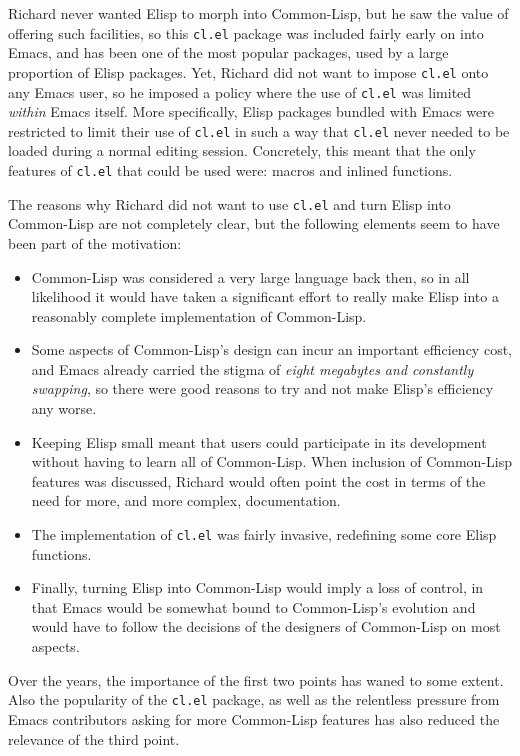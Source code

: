 \documentclass[format=acmsmall, review=false, screen=true]{acmart}
\newcommand \Elisp {Elisp}
\begin{document}
Richard never wanted \Elisp{} to morph into Common-Lisp, but he saw the
value of offering such facilities, so this \texttt{cl.el} package was
included fairly early on into Emacs, and has been one of the most popular
packages, used by a large proportion of \Elisp{} packages.  Yet, Richard did
not want to impose \texttt{cl.el} onto any Emacs user, so he imposed
a policy where the use of \texttt{cl.el} was limited \emph{within} Emacs
itself.  More specifically, \Elisp{} packages bundled with Emacs were
restricted to limit their use of \texttt{cl.el} in such a way that
\texttt{cl.el} never needed to be loaded during a normal editing session.
Concretely, this meant that the only features of \texttt{cl.el} that could
be used were: macros and inlined functions.

The reasons why Richard did not want to use \texttt{cl.el} and turn \Elisp{}
into Common-Lisp are not completely clear, but the following elements seem
to have been part of the motivation:
\begin{itemize}
\item Common-Lisp was considered a very large language back then, so in all
  likelihood it would have taken a significant effort to really make
  \Elisp{} into a reasonably complete implementation of Common-Lisp.
\item Some aspects of Common-Lisp's design can incur an important efficiency
  cost, and Emacs already carried the stigma of \emph{eight megabytes and
    constantly swapping}, so there were good reasons to try and not make
  \Elisp{}'s efficiency any worse.
\item Keeping \Elisp{} small meant that users could participate in its
  development without having to learn all of Common-Lisp.  When inclusion of
  Common-Lisp features was discussed, Richard would often point the cost
  in terms of the need for more, and more complex, documentation.
\item The implementation of \texttt{cl.el} was fairly invasive, redefining
  some core \Elisp{} functions.
\item Finally, turning \Elisp{} into Common-Lisp would imply a loss of control,
  in that Emacs would be somewhat bound to Common-Lisp's evolution and would
  have to follow the decisions of the designers of Common-Lisp on most aspects.
\end{itemize}
Over the years, the importance of the first two points has waned to some
extent.  Also the popularity of the \texttt{cl.el} package, as well as the
relentless pressure from Emacs contributors asking for more Common-Lisp
features has also reduced the relevance of the third point.
\end{document}
